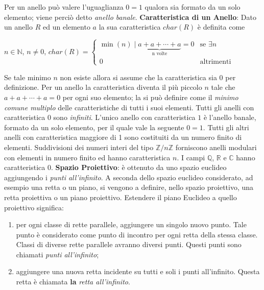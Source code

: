 \documentclass[a4paper,12pt]{tesiinfo}
\begin{document}
\newline
Per un anello pu\`o valere l'uguaglianza $0 = 1$ qualora sia formato da un solo elemento; viene perci\`o detto \textit{anello banale}.
\newline\newline
%
%
%
\textbf{Caratteristica di un Anello}: Dato un anello $R$ ed un elemento $a$ la sua caratteristica $char(R)$ \`e definita come \begin{center} $n  \in \mathbb{N}$, $n \ne 0 $, $char(R) = \begin{cases} \min (n) \mid \underbrace{a+a+\cdots+a}_\text{n volte} = 0 & \mbox{se }\exists n\\
0 & \mbox{altrimenti}
\end{cases}$
\end{center}
Se tale minimo $n$ non esiste allora si assume che la caratteristica sia 0 per definizione.
Per un anello la caratteristica diventa il pi\`u piccolo $n$ tale che $a+a+\cdots+a{{=}}0$ per ogni suo elemento; la si pu\`o definire come il \textit{minimo comune multiplo} delle caratteristiche di tutti i suoi elementi. 
Tutti gli anelli con caratteristica $0$ sono \textit{infiniti}.\newline
L'unico anello con caratteristica $1$ \`e l'anello banale, formato da un solo elemento, per il quale vale la seguente $0 {{=}} 1$.\newline
Tutti gli altri anelli con caratteristica maggiore di 1 sono costituiti da un numero finito di elementi. Suddivisioni dei numeri interi del tipo $\mathbb{Z}/n\mathbb{Z}$ forniscono anelli modulari con elementi in numero finito ed hanno caratteristica $n$.\newline
I campi $\mathbb{Q}$, $\mathbb{R}$ e $\mathbb{C}$ hanno caratteristica $0$.
\newline\newline
%
%
%
\textbf{Spazio Proiettivo}: \`e ottenuto da uno spazio euclideo aggiungendo i \textit{punti all'infinito}. A seconda dello spazio euclideo considerato, ad esempio una retta o un piano, si vengono a definire, nello spazio proiettivo, una retta proiettiva o un piano proiettivo. 
Estendere il piano Euclideo a quello proiettivo significa:
\begin{enumerate}
    \item per ogni classe di rette parallele, aggiungere un singolo nuovo punto. Tale punto \`e considerato come punto di incontro per ogni retta della stessa classe. Classi di diverse rette parallele avranno diversi punti. Questi punti sono chiamati \textit{punti all'infinito};
    \item aggiungere una nuova retta incidente su tutti e soli i punti all'infinito. Questa retta \`e chiamata \textbf{la} \textit{retta all'infinito}.
\end{enumerate}
\end{document}
